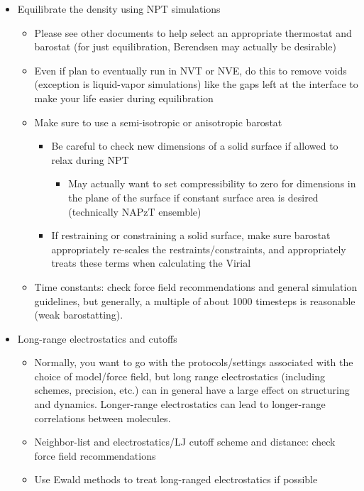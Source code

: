 \documentclass[9pt]{livecoms}
\begin{document}
\begin{itemize}
\begin{itemize}
	\end{itemize}
	\item Equilibrate the density using NPT simulations
	\begin{itemize}
		\item Please see other documents to help select an appropriate thermostat and barostat (for just equilibration, Berendsen may actually be desirable)
		\item Even if plan to eventually run in NVT or NVE, do this to remove voids (exception is liquid-vapor simulations) like the gaps left at the interface to make your life easier during equilibration
		\item Make sure to use a semi-isotropic or anisotropic barostat
		\begin{itemize}
			\item Be careful to check new dimensions of a solid surface if allowed to relax during NPT
			\begin{itemize}
				\item May actually want to set compressibility to zero for dimensions in the plane of the surface if constant surface area is desired (technically NAPzT ensemble)
			\end{itemize}
			\item If restraining or constraining a solid surface, make sure barostat appropriately re-scales the restraints/constraints, and appropriately treats these terms when calculating the Virial
		\end{itemize}
		\item Time constants: check force field recommendations and general simulation guidelines, but generally, a multiple of about 1000 timesteps is reasonable (weak barostatting).
	\end{itemize}
	\item Long-range electrostatics and cutoffs
	\begin{itemize}
		\item Normally, you want to go with the protocols/settings associated with the choice of model/force field, but long range electrostatics (including schemes, precision, etc.) can in general have a large effect on structuring and dynamics. 
		Longer-range electrostatics can lead to longer-range correlations between molecules.
		\item Neighbor-list and electrostatics/LJ cutoff scheme and distance: check force field recommendations
		\item Use Ewald methods to treat long-ranged electrostatics if possible
		\begin{itemize}

\end{itemize}
\end{itemize}
\end{itemize}
\end{document}
